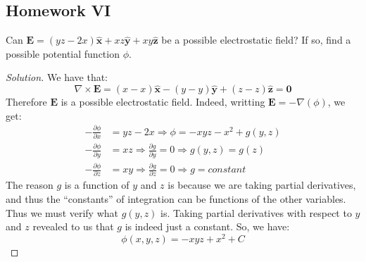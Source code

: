 \documentclass[crop=false,class=book,oneside]{standalone}
\begin{document}
        \subsection{Homework VI}
            \begin{problem}[Wangsness 5-1]
                Can
                $\mathbf{E}%
                 =(yz-2x)\hat{\mathbf{x}}%
                 +xz\hat{\mathbf{y}}%
                 +xy\hat{\mathbf{z}}$
                be a possible electrostatic field? If so,
                find a possible potential function $\phi$.
            \end{problem}
            \begin{proof}[Solution]
                We have that:
                \begin{equation*}
                    \nabla\times\mathbf{E}
                    =(x-x)\hat{\mathbf{x}}
                    -(y-y)\hat{\mathbf{y}}
                    +(z-z)\hat{\mathbf{z}}
                    =\mathbf{0}    
                \end{equation*}
                Therefore $\mathbf{E}$ is a possible electrostatic field.
                Indeed, writting $\mathbf{E}=-\nabla(\phi)$, we get:
                \begin{align*}
                    -\frac{\partial\phi}{\partial{x}}
                    &=yz-2x
                    \Rightarrow\phi=-xyz-x^{2}+g(y,z)\\
                    -\frac{\partial\phi}{\partial{y}}
                    &=xz
                    \Rightarrow\frac{\partial{g}}{\partial{y}}=0
                    \Rightarrow{g(y,z)=g(z)}\\
                    -\frac{\partial\phi}{\partial{z}}
                    &=xy
                    \Rightarrow\frac{\partial{g}}{\partial{z}}=0
                    \Rightarrow{g=constant}
                \end{align*}
                The reason $g$ is a function of $y$ and $z$ is because
                we are taking partial derivatives, and thus the
                ``constants'' of integration can be functions of
                the other variables. Thus we must verify what $g(y,z)$
                is. Taking partial derivatives with respect to
                $y$ and $z$ revealed to us that $g$ is indeed just
                a constant. So, we have:
                \begin{equation*}
                    \phi(x,y,z)=-xyz+x^{2}+C    
                \end{equation*}

\end{proof}
\end{document}
